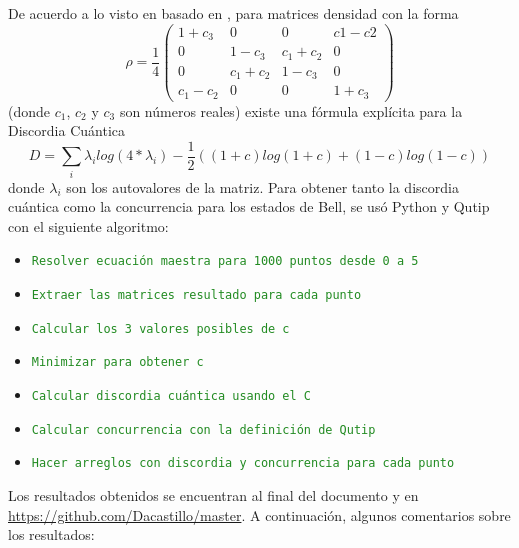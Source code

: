 \documentclass{book}
\begin{document}
De acuerdo a lo visto en \cite{Omar} basado en \cite{Method}, para matrices densidad con la forma
\begin{equation}\label{eq3}{\rho=\frac{1}{4}\begin{pmatrix}1+c_3&0&0&c1-c2
\\0&1-c_3&c_1+c_2&0\\0&c_1+c_2&1-c_3&0\\c_1-c_2&0&0&1+c_3\end{pmatrix}}\end{equation}
(donde ${c_1}$, ${c_2}$ y ${c_3}$ son números reales) existe una fórmula explícita para la Discordia Cuántica
\begin{equation} {D=\sum_i\lambda_ilog(4*\lambda_i)-\frac{1}{2}((1+c)log(1+c)+(1-c)log(1-c))}\end{equation}
donde $\lambda_i$ son los autovalores de la matriz. Para obtener tanto la discordia cuántica como la concurrencia para los estados de Bell, se usó Python y Qutip con el siguiente algoritmo:\\ 
\begin{itemize}
\item\textcolor{ForestGreen}{\texttt{Resolver ecuación maestra para 1000 puntos desde 0 a 5}}
\item\textcolor{ForestGreen}{\texttt{Extraer las matrices resultado para cada punto}}
\item\textcolor{ForestGreen}{\texttt{Calcular los 3 valores posibles de c}}
\item\textcolor{ForestGreen}{\texttt{Minimizar para obtener c}}
\item\textcolor{ForestGreen}{\texttt{Calcular discordia cuántica usando el C}}
\item\textcolor{ForestGreen}{\texttt{Calcular concurrencia con la definición de Qutip}}
\item\textcolor{ForestGreen}{\texttt{Hacer arreglos con discordia y concurrencia para cada punto}}
\end{itemize}
Los resultados obtenidos se encuentran al final del documento y en \textcolor{ForestGreen}{\url{https://github.com/Dacastillo/master}}. A continuación, algunos comentarios sobre los resultados:
\end{document}
